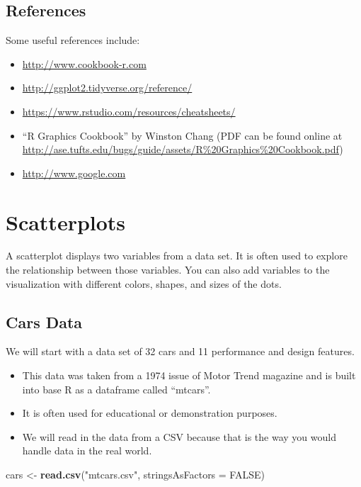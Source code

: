 \documentclass[oneside]{memoir}
\newenvironment{Shaded}{\begin{snugshade}}{\end{snugshade}}
\newcommand{\KeywordTok}[1]{\textcolor[rgb]{0.13,0.29,0.53}{\textbf{#1}}}
\newcommand{\DataTypeTok}[1]{\textcolor[rgb]{0.13,0.29,0.53}{#1}}
\newcommand{\StringTok}[1]{\textcolor[rgb]{0.31,0.60,0.02}{#1}}
\newcommand{\OtherTok}[1]{\textcolor[rgb]{0.56,0.35,0.01}{#1}}
\newcommand{\NormalTok}[1]{#1}
\theoremstyle{definition}
\theoremstyle{definition}
\theoremstyle{definition}
\theoremstyle{remark}
\begin{document}
\section{References}\label{references}

Some useful references include:

\begin{itemize}
\item
  \url{http://www.cookbook-r.com}
\item
  \url{http://ggplot2.tidyverse.org/reference/}
\item
  \url{https://www.rstudio.com/resources/cheatsheets/}
\item
  ``R Graphics Cookbook'' by Winston Chang (PDF can be found online at
  \url{http://ase.tufts.edu/bugs/guide/assets/R\%20Graphics\%20Cookbook.pdf})
\item
  \url{http://www.google.com}
\end{itemize}

\chapter{Scatterplots}\label{scatterplots}

A scatterplot displays two variables from a data set. It is often used
to explore the relationship between those variables. You can also add
variables to the visualization with different colors, shapes, and sizes
of the dots.

\section{Cars Data}\label{cars-data}

We will start with a data set of 32 cars and 11 performance and design
features.

\begin{itemize}
\item
  This data was taken from a 1974 issue of Motor Trend magazine and is
  built into base R as a dataframe called ``mtcars''.
\item
  It is often used for educational or demonstration purposes.
\item
  We will read in the data from a CSV because that is the way you would
  handle data in the real world.
\end{itemize}

\begin{Shaded}
\begin{Highlighting}[]
\NormalTok{cars <-}\StringTok{ }\KeywordTok{read.csv}\NormalTok{(}\StringTok{"mtcars.csv"}\NormalTok{, }\DataTypeTok{stringsAsFactors =} \OtherTok{FALSE}\NormalTok{)}
\end{Highlighting}
\end{Shaded}
\end{document}
